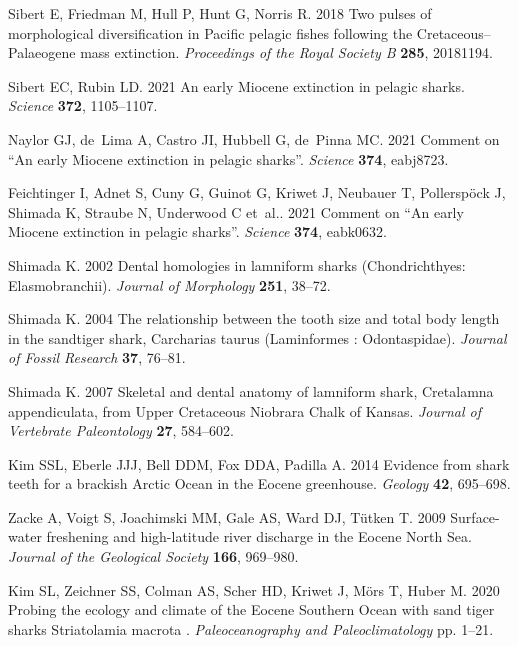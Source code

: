 \documentclass[]{rsos}%
\begin{document}
\begin{thebibliography}{99}

Sibert E, Friedman M, Hull P, Hunt G, Norris R. 2018  Two pulses of
  morphological diversification in Pacific pelagic fishes following the
  Cretaceous--Palaeogene mass extinction. {\em Proceedings of the Royal Society
  B} \textbf{285}, 20181194.

Sibert EC, Rubin LD. 2021  An early Miocene extinction in pelagic sharks. {\em
  Science} \textbf{372}, 1105--1107.

Naylor GJ, de~Lima A, Castro JI, Hubbell G, de~Pinna MC. 2021  Comment on “An
  early Miocene extinction in pelagic sharks”. {\em Science} \textbf{374},
  eabj8723.

Feichtinger I, Adnet S, Cuny G, Guinot G, Kriwet J, Neubauer T, Pollersp{\"o}ck
  J, Shimada K, Straube N, Underwood C et~al.. 2021  Comment on “An early
  Miocene extinction in pelagic sharks”. {\em Science} \textbf{374},
  eabk0632.

Shimada K. 2002  {Dental homologies in lamniform sharks (Chondrichthyes:
  Elasmobranchii)}. {\em Journal of Morphology} \textbf{251}, 38--72.

Shimada K. 2004  {The relationship between the tooth size and total body length
  in the sandtiger shark, Carcharias taurus (Laminformes : Odontaspidae)}. {\em
  Journal of Fossil Research} \textbf{37}, 76--81.

Shimada K. 2007  {Skeletal and dental anatomy of lamniform shark, Cretalamna
  appendiculata, from Upper Cretaceous Niobrara Chalk of Kansas}. {\em Journal
  of Vertebrate Paleontology} \textbf{27}, 584--602.

Kim SSL, Eberle JJJ, Bell DDM, Fox DDA, Padilla A. 2014  {Evidence from shark
  teeth for a brackish Arctic Ocean in the Eocene greenhouse}. {\em Geology}
  \textbf{42}, 695--698.

Zacke A, Voigt S, Joachimski MM, Gale AS, Ward DJ, T{\"u}tken T. 2009
  Surface-water freshening and high-latitude river discharge in the Eocene
  North Sea. {\em Journal of the Geological Society} \textbf{166}, 969--980.

Kim SL, Zeichner SS, Colman AS, Scher HD, Kriwet J, M{\"{o}}rs T, Huber M. 2020
   { Probing the ecology and climate of the Eocene Southern Ocean with sand
  tiger sharks Striatolamia macrota }. {\em Paleoceanography and
  Paleoclimatology} pp. 1--21.


\end{thebibliography}
\end{document}
